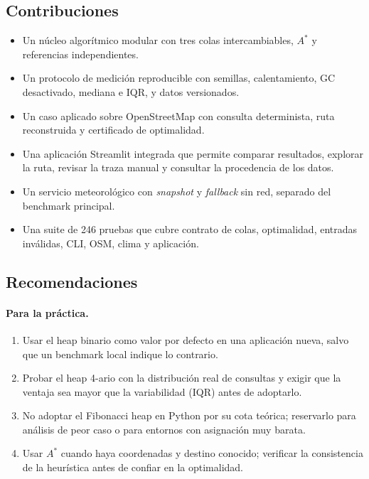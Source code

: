 \subsection{Contribuciones}
\begin{itemize}
    \item Un núcleo algorítmico modular con tres colas intercambiables, $A^*$ y referencias independientes.
    \item Un protocolo de medición reproducible con semillas, calentamiento, GC desactivado, mediana e IQR, y datos versionados.
    \item Un caso aplicado sobre OpenStreetMap con consulta determinista, ruta reconstruida y certificado de optimalidad.
    \item Una aplicación Streamlit integrada que permite comparar resultados, explorar la ruta, revisar la traza manual y consultar la procedencia de los datos.
    \item Un servicio meteorológico con \textit{snapshot} y \textit{fallback} sin red, separado del benchmark principal.
    \item Una suite de 246 pruebas que cubre contrato de colas, optimalidad, entradas inválidas, CLI, OSM, clima y aplicación.
\end{itemize}

\subsection{Recomendaciones}
\paragraph{Para la práctica.}
\begin{enumerate}
    \item Usar el heap binario como valor por defecto en una aplicación nueva, salvo que un benchmark local indique lo contrario.
    \item Probar el heap 4-ario con la distribución real de consultas y exigir que la ventaja sea mayor que la variabilidad (IQR) antes de adoptarlo.
    \item No adoptar el Fibonacci heap en Python por su cota teórica; reservarlo para análisis de peor caso o para entornos con asignación muy barata.
    \item Usar $A^*$ cuando haya coordenadas y destino conocido; verificar la consistencia de la heurística antes de confiar en la optimalidad.
\end{enumerate}

